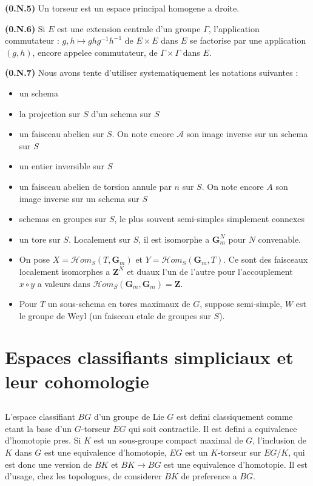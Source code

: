 \documentclass[11pt,a4paper]{article}
\theoremstyle{plain}
\theoremstyle{definition}
\begin{document}
\textbf{(0.N.5)} Un torseur est un espace principal homogene a droite.

\textbf{(0.N.6)} Si $E$ est une extension centrale d'un groupe $\Gamma$, l'application commutateur : $g,h \mapsto ghg^{-1}h^{-1}$ de $E \times E$ dans $E$ se factorise par une application $(g,h)$, encore appelee commutateur, de $\Gamma \times \Gamma$ dans $E$.

\textbf{(0.N.7)} Nous avons tente d'utiliser systematiquement les notations suivantes :

\begin{itemize}[leftmargin=*]
\item[$S$] un schema
\item[$a$] la projection sur $S$ d'un schema sur $S$
\item[$\mathscr{A}$] un faisceau abelien sur $S$. On note encore $\mathscr{A}$ son image inverse sur un schema sur $S$
\item[$n$] un entier inversible sur $S$
\item[$A$] un faisceau abelien de torsion annule par $n$ sur $S$. On note encore $A$ son image inverse sur un schema sur $S$
\item[$G, H$] schemas en groupes sur $S$, le plus souvent semi-simples simplement connexes
\item[$T$] un tore sur $S$. Localement sur $S$, il est isomorphe a $\mathbf{G}_m^N$ pour $N$ convenable.
\item[] On pose $X = \mathscr{H}om_S(T, \mathbf{G}_m)$ et $Y = \mathscr{H}om_S(\mathbf{G}_m, T)$. Ce sont des faisceaux localement isomorphes a $\mathbf{Z}^N$ et duaux l'un de l'autre pour l'accouplement $x \circ y$ a valeurs dans $\mathscr{H}om_S(\mathbf{G}_m, \mathbf{G}_m) = \mathbf{Z}$.
\item[] Pour $T$ un sous-schema en tores maximaux de $G$, suppose semi-simple, $W$ est le groupe de Weyl (un faisceau etale de groupes sur $S$).
\end{itemize}

\section{Espaces classifiants simpliciaux et leur cohomologie}

\subsection{}\label{1.1}

L'espace classifiant $BG$ d'un groupe de Lie $G$ est defini classiquement comme etant la base d'un $G$-torseur $EG$ qui soit contractile. Il est defini a equivalence d'homotopie pres. Si $K$ est un sous-groupe compact maximal de $G$, l'inclusion de $K$ dans $G$ est une equivalence d'homotopie, $EG$ est un $K$-torseur sur $EG/K$, qui est donc une version de $BK$ et $BK \to BG$ est une equivalence d'homotopie. Il est d'usage, chez les topologues, de considerer $BK$ de preference a $BG$.
\end{document}

